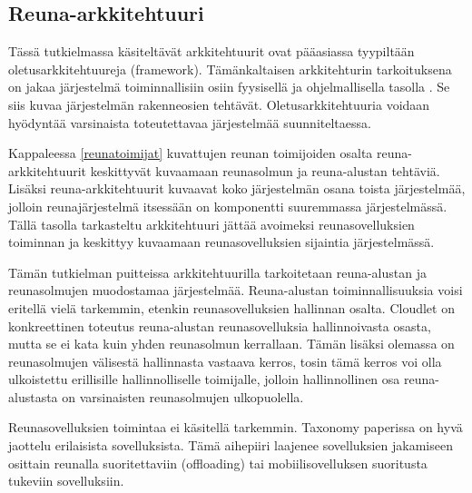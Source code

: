


\subsection{Reuna-arkkitehtuuri}


Tässä tutkielmassa käsiteltävät arkkitehtuurit ovat pääasiassa tyypiltään oletusarkkitehtuureja (framework). 
Tämänkaltaisen arkkitehturin tarkoituksena on jakaa järjestelmä toiminnallisiin osiin fyysisellä ja ohjelmallisella tasolla \cite{ohark}. Se siis kuvaa järjestelmän rakenneosien tehtävät.
Oletusarkkitehtuuria voidaan hyödyntää varsinaista toteutettavaa järjestelmää suunniteltaessa.

Kappaleessa \ref{reunatoimijat} kuvattujen reunan toimijoiden osalta reuna-arkkitehtuurit keskittyvät kuvaamaan reunasolmun ja reuna-alustan tehtäviä. Lisäksi reuna-arkkitehtuurit kuvaavat koko järjestelmän osana toista järjestelmää, jolloin reunajärjestelmä itsessään on komponentti suuremmassa järjestelmässä. Tällä tasolla tarkasteltu arkkitehtuuri jättää avoimeksi reunasovelluksien toiminnan ja keskittyy kuvaamaan reunasovelluksien sijaintia järjestelmässä.

Tämän tutkielman puitteissa arkkitehtuurilla tarkoitetaan reuna-alustan ja reunasolmujen muodostamaa järjestelmää. Reuna-alustan toiminnallisuuksia voisi eritellä vielä tarkemmin, etenkin reunasovelluksien hallinnan osalta. Cloudlet on konkreettinen toteutus reuna-alustan reunasovelluksia hallinnoivasta osasta, mutta se ei kata kuin yhden reunasolmun kerrallaan. 
Tämän lisäksi olemassa on reunasolmujen välisestä hallinnasta vastaava kerros, tosin tämä kerros voi olla ulkoistettu erillisille hallinnolliselle toimijalle, jolloin hallinnollinen osa reuna-alustasta on varsinaisten reunasolmujen ulkopuolella. 

Reunasovelluksien toimintaa ei käsitellä tarkemmin. Taxonomy paperissa on hyvä jaottelu erilaisista sovelluksista. Tämä aihepiiri laajenee sovelluksien jakamiseen osittain reunalla suoritettaviin (offloading) tai mobiilisovelluksen suoritusta tukeviin sovelluksiin. 

